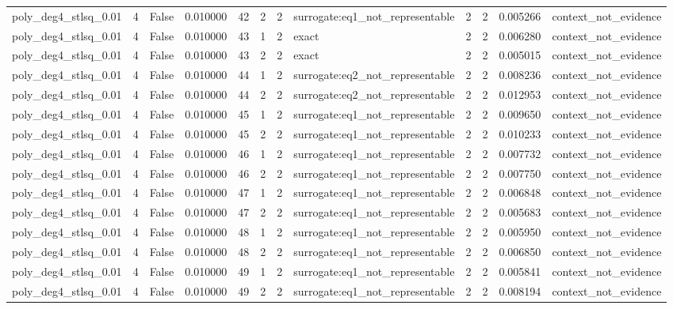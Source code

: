 \begin{tabular}{lrrrrrrlrrrl}
poly\_deg4\_stlsq\_0.01 & 4 & False & 0.010000 & 42 & 2 & 2 & surrogate:eq1\_not\_representable & 2 & 2 & 0.005266 & context\_not\_evidence \\
poly\_deg4\_stlsq\_0.01 & 4 & False & 0.010000 & 43 & 1 & 2 & exact & 2 & 2 & 0.006280 & context\_not\_evidence \\
poly\_deg4\_stlsq\_0.01 & 4 & False & 0.010000 & 43 & 2 & 2 & exact & 2 & 2 & 0.005015 & context\_not\_evidence \\
poly\_deg4\_stlsq\_0.01 & 4 & False & 0.010000 & 44 & 1 & 2 & surrogate:eq2\_not\_representable & 2 & 2 & 0.008236 & context\_not\_evidence \\
poly\_deg4\_stlsq\_0.01 & 4 & False & 0.010000 & 44 & 2 & 2 & surrogate:eq2\_not\_representable & 2 & 2 & 0.012953 & context\_not\_evidence \\
poly\_deg4\_stlsq\_0.01 & 4 & False & 0.010000 & 45 & 1 & 2 & surrogate:eq1\_not\_representable & 2 & 2 & 0.009650 & context\_not\_evidence \\
poly\_deg4\_stlsq\_0.01 & 4 & False & 0.010000 & 45 & 2 & 2 & surrogate:eq1\_not\_representable & 2 & 2 & 0.010233 & context\_not\_evidence \\
poly\_deg4\_stlsq\_0.01 & 4 & False & 0.010000 & 46 & 1 & 2 & surrogate:eq1\_not\_representable & 2 & 2 & 0.007732 & context\_not\_evidence \\
poly\_deg4\_stlsq\_0.01 & 4 & False & 0.010000 & 46 & 2 & 2 & surrogate:eq1\_not\_representable & 2 & 2 & 0.007750 & context\_not\_evidence \\
poly\_deg4\_stlsq\_0.01 & 4 & False & 0.010000 & 47 & 1 & 2 & surrogate:eq1\_not\_representable & 2 & 2 & 0.006848 & context\_not\_evidence \\
poly\_deg4\_stlsq\_0.01 & 4 & False & 0.010000 & 47 & 2 & 2 & surrogate:eq1\_not\_representable & 2 & 2 & 0.005683 & context\_not\_evidence \\
poly\_deg4\_stlsq\_0.01 & 4 & False & 0.010000 & 48 & 1 & 2 & surrogate:eq1\_not\_representable & 2 & 2 & 0.005950 & context\_not\_evidence \\
poly\_deg4\_stlsq\_0.01 & 4 & False & 0.010000 & 48 & 2 & 2 & surrogate:eq1\_not\_representable & 2 & 2 & 0.006850 & context\_not\_evidence \\
poly\_deg4\_stlsq\_0.01 & 4 & False & 0.010000 & 49 & 1 & 2 & surrogate:eq1\_not\_representable & 2 & 2 & 0.005841 & context\_not\_evidence \\
poly\_deg4\_stlsq\_0.01 & 4 & False & 0.010000 & 49 & 2 & 2 & surrogate:eq1\_not\_representable & 2 & 2 & 0.008194 & context\_not\_evidence \\

\end{tabular}
